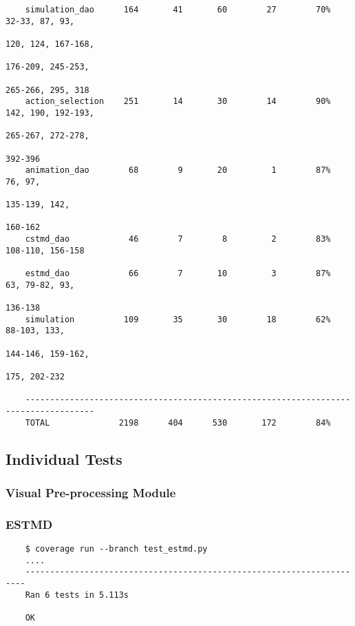 \documentclass[a4paper,11pt]{article}
\begin{document}
\begin{verbatim}
    simulation_dao      164       41       60        27        70%   32-33, 87, 93, 
                                                                     120, 124, 167-168, 
                                                                     176-209, 245-253, 
                                                                     265-266, 295, 318
    action_selection    251       14       30        14        90%   142, 190, 192-193, 
                                                                     265-267, 272-278, 
                                                                     392-396
    animation_dao        68        9       20         1        87%   76, 97, 
    	                                                                 135-139, 142, 
    	                                                                 160-162
    cstmd_dao            46        7        8         2        83%   108-110, 156-158 
                                                                                                                
    estmd_dao            66        7       10         3        87%   63, 79-82, 93, 
                                                                     136-138
    simulation          109       35       30        18        62%   88-103, 133, 
                                                                     144-146, 159-162, 
                                                                     175, 202-232

    ------------------------------------------------------------------------------------
    TOTAL              2198      404      530       172        84%  
    \end{verbatim}
    
    
\subsection{Individual Tests}
\subsubsection{Visual Pre-processing Module}
\subsubsection*{{\hspace{6mm}}ESTMD}
\begin{verbatim}
    $ coverage run --branch test_estmd.py
    ....
    ----------------------------------------------------------------------
    Ran 6 tests in 5.113s

    OK
\end{verbatim}
\end{document}
